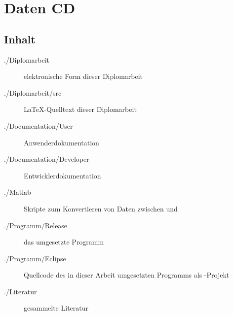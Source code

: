 \chapter{Daten CD}

\section*{Inhalt}


\begin{description}
	\item[./Diplomarbeit] elektronische Form dieser Diplomarbeit
	\item[./Diplomarbeit/src] \LaTeX -Quelltext dieser Diplomarbeit
	\item[./Documentation/User] Anwenderdokumentation
	\item[./Documentation/Developer] Entwicklerdokumentation
	\item[./Matlab] Skripte zum Konvertieren von Daten zwischen \ml und \us
	\item[./Programm/Release] das umgesetzte Programm
	\item[./Programm/Eclipse] Quellcode des in dieser Arbeit umgesetzten Programms als \eclipseNS -Projekt
	\item[./Literatur] gesammelte Literatur
\end{description}

